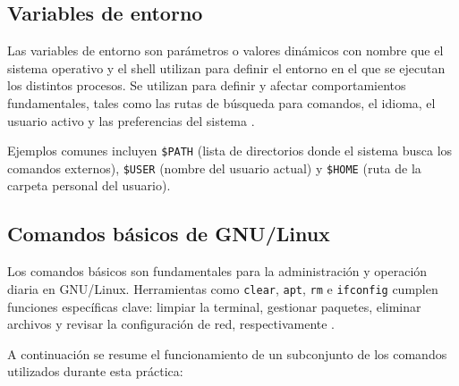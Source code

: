 \subsection{Variables de entorno}
Las variables de entorno son parámetros o valores dinámicos con nombre que el sistema operativo y el shell utilizan para definir el entorno en el que se ejecutan los distintos procesos. Se utilizan para definir y afectar comportamientos fundamentales, tales como las rutas de búsqueda para comandos, el idioma, el usuario activo y las preferencias del sistema \cite{shotts:linux-command-line:2019}.

Ejemplos comunes incluyen \texttt{\$PATH} (lista de directorios donde el sistema busca los comandos externos), \texttt{\$USER} (nombre del usuario actual) y \texttt{\$HOME} (ruta de la carpeta personal del usuario).

\subsection{Comandos básicos de GNU/Linux}
Los comandos básicos son fundamentales para la administración y operación diaria en GNU/Linux. Herramientas como \texttt{clear}, \texttt{apt}, \texttt{rm} e \texttt{ifconfig} cumplen funciones específicas clave: limpiar la terminal, gestionar paquetes, eliminar archivos y revisar la configuración de red, respectivamente \cite{sobell:practical-guide-linux:2017}.

A continuación se resume el funcionamiento de un subconjunto de los comandos utilizados durante esta práctica:

